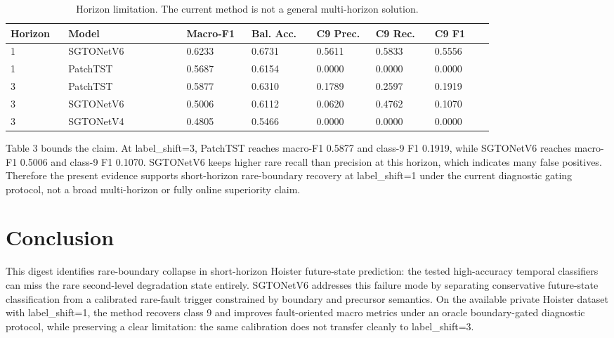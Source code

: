 \documentclass[12pt]{article}
\begin{document}
\begin{table}[t]
                \caption{Horizon limitation. The current method is not a general multi-horizon solution.}
                \centering
                \scriptsize
                \setlength{\tabcolsep}{2.5pt}
                \renewcommand{\arraystretch}{1.05}
                \begin{tabular}{@{}p{0.08\linewidth} p{0.20\linewidth} p{0.11\linewidth} p{0.11\linewidth} p{0.10\linewidth} p{0.10\linewidth} p{0.10\linewidth}@{}}
                \toprule
                Horizon & Model & Macro-F1 & Bal. Acc. & C9 Prec. & C9 Rec. & C9 F1 \\ \midrule
1 & SGTONetV6 & 0.6233 & 0.6731 & 0.5611 & 0.5833 & 0.5556 \\
1 & PatchTST & 0.5687 & 0.6154 & 0.0000 & 0.0000 & 0.0000 \\
3 & PatchTST & 0.5877 & 0.6310 & 0.1789 & 0.2597 & 0.1919 \\
3 & SGTONetV6 & 0.5006 & 0.6112 & 0.0620 & 0.4762 & 0.1070 \\
3 & SGTONetV4 & 0.4805 & 0.5466 & 0.0000 & 0.0000 & 0.0000 \\
                \bottomrule
                \end{tabular}
                \end{table}
Table 3 bounds the claim. At label\_shift=3, PatchTST reaches macro-F1 0.5877 and class-9 F1 0.1919, while SGTONetV6 reaches macro-F1 0.5006 and class-9 F1 0.1070. SGTONetV6 keeps higher rare recall than precision at this horizon, which indicates many false positives. Therefore the present evidence supports short-horizon rare-boundary recovery at label\_shift=1 under the current diagnostic gating protocol, not a broad multi-horizon or fully online superiority claim.

\section{Conclusion}
This digest identifies rare-boundary collapse in short-horizon Hoister future-state prediction: the tested high-accuracy temporal classifiers can miss the rare second-level degradation state entirely. SGTONetV6 addresses this failure mode by separating conservative future-state classification from a calibrated rare-fault trigger constrained by boundary and precursor semantics. On the available private Hoister dataset with label\_shift=1, the method recovers class 9 and improves fault-oriented macro metrics under an oracle boundary-gated diagnostic protocol, while preserving a clear limitation: the same calibration does not transfer cleanly to label\_shift=3.
\end{document}
